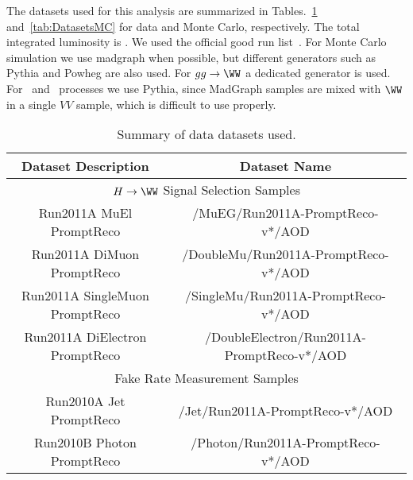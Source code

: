 The datasets used for this analysis are summarized in 
Tables.~\ref{tab:DatasetsData} and~\ref{tab:DatasetsMC} for data and Monte 
Carlo, respectively. The total integrated luminosity is \intlumi. 
We used the official good run list~\cite{json}. For Monte Carlo simulation 
we use madgraph when possible, 
but different generators such as Pythia and Powheg 
are also used. 
For $gg \to \WW$ a dedicated generator is used. For \wz\ and \zz\
processes we use Pythia, since MadGraph samples are mixed with $\WW$ in
a single $VV$ sample, which is difficult to use properly.

\begin{table}[!ht]
\begin{center}
\begin{tabular}{|c|c|}
\hline
 Dataset Description                   &   Dataset Name   \\
\hline
\hline
\multicolumn{2}{|c|}{$H \to \WW$ Signal Selection Samples} \\
\hline
Run2011A MuEl PromptReco            &  /MuEG/Run2011A-PromptReco-v*/AOD   \\
Run2011A DiMuon PromptReco          &  /DoubleMu/Run2011A-PromptReco-v*/AOD   \\
Run2011A SingleMuon PromptReco      &  /SingleMu/Run2011A-PromptReco-v*/AOD   \\
Run2011A DiElectron PromptReco      &  /DoubleElectron/Run2011A-PromptReco-v*/AOD   \\
\hline
\hline
\multicolumn{2}{|c|}{Fake Rate Measurement Samples} \\
\hline
Run2010A Jet  PromptReco            & /Jet/Run2011A-PromptReco-v*/AOD	\\
Run2010B Photon PromptReco          & /Photon/Run2011A-PromptReco-v*/AOD \\
\hline
\end{tabular}
\caption{Summary of data datasets used.\label{tab:DatasetsData}}
\end{center}
\end{table}

